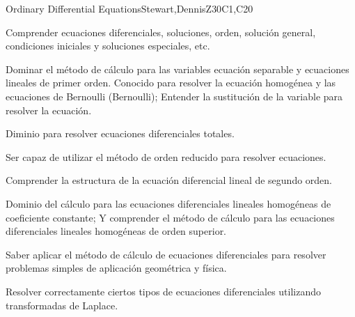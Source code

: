 \begin{syllabus}
\begin{unit}{Ordinary Differential Equations}{}{Stewart,DennisZ}{30}{C1,C20}
   \begin{learningoutcomes}
    \item Comprender ecuaciones diferenciales, soluciones, orden, solución general, condiciones iniciales y soluciones especiales, etc.
    \item Dominar el método de cálculo para las variables ecuación separable y ecuaciones lineales de primer orden. Conocido para resolver la ecuación homogénea y las ecuaciones de Bernoulli (Bernoulli); Entender la sustitución de la variable para resolver la ecuación.
    \item Diminio  para resolver ecuaciones diferenciales totales.
    \item Ser capaz de utilizar el método de orden reducido para resolver ecuaciones.
    \item Comprender la estructura de la ecuación diferencial lineal de segundo orden.
    \item Dominio del cálculo para las ecuaciones diferenciales lineales homogéneas de coeficiente constante; Y comprender el método de cálculo para las ecuaciones diferenciales lineales homogéneas de orden superior.
    \item Saber aplicar el método de cálculo de ecuaciones diferenciales para resolver problemas simples de aplicación geométrica y física.
    \item Resolver correctamente ciertos tipos de ecuaciones diferenciales utilizando transformadas de Laplace.

   \end{learningoutcomes}
\end{unit}



\begin{coursebibliography}
\end{coursebibliography}

\end{syllabus}

